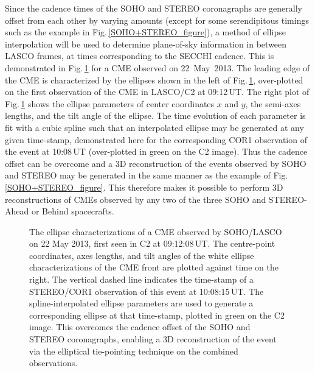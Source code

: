 \documentclass[preprint2]{aastex}
\begin{document}
Since the cadence times of the SOHO and STEREO coronagraphs are generally offset from each other by varying amounts (except for some serendipitous timings such as the example in Fig.\,\ref{SOHO+STEREO_figure}), a method of ellipse interpolation will be used to determine plane-of-sky information in between LASCO frames, at times corresponding to the SECCHI cadence. This is demonstrated in Fig.\,\ref{ellipse_params} for a CME observed on 22~May~2013. The leading edge of the CME is characterized by the ellipses shown in the left of Fig.\,\ref{ellipse_params}, over-plotted on the first observation of the CME in LASCO/C2 at 09:12\,UT. The right plot of Fig.\,\ref{ellipse_params} shows the ellipse parameters of center coordinates $x$ and $y$, the semi-axes lengths, and the tilt angle of the ellipse. The time evolution of each parameter is fit with a cubic spline such that an interpolated ellipse may be generated at any given time-stamp, demonstrated here for the corresponding COR1 observation of the event at 10:08\,UT (over-plotted in green on the C2 image). Thus the cadence offset can be overcome and a 3D reconstruction of the events observed by SOHO and STEREO may be generated in the same manner as the example of Fig.\,\ref{SOHO+STEREO_figure}. This therefore makes it possible to perform 3D reconstructions of CMEs observed by any two of the three SOHO and STEREO-Ahead or Behind spacecrafts. 


\begin{figure}[ht]
\caption{The ellipse characterizations of a CME observed by SOHO/LASCO on 22 May 2013, first seen in C2 at 09:12:08\,UT. The centre-point coordinates, axes lengths, and tilt angles of the white ellipse characterizations of the CME front are plotted against time on the right. The vertical dashed line indicates the time-stamp of a STEREO/COR1 observation of this event at 10:08:15\,UT. The spline-interpolated ellipse parameters are used to generate a corresponding ellipse at that time-stamp, plotted in green on the C2 image. This overcomes the cadence offset of the SOHO and STEREO coronagraphs, enabling a 3D reconstruction of the event via the elliptical tie-pointing technique on the combined observations.}
\label{ellipse_params}
\end{figure}
\end{document}
